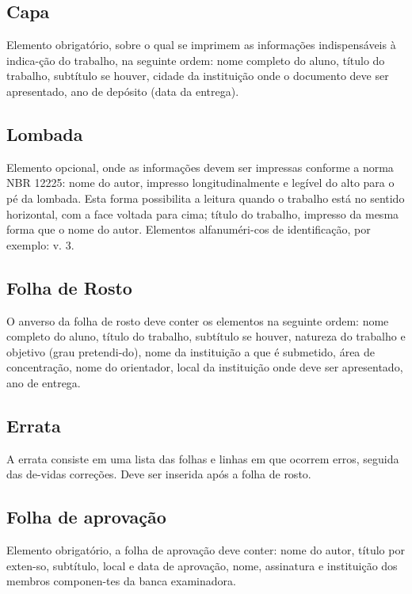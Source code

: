 \subsection{Capa}

Elemento obrigatório, sobre o qual se imprimem as informações
indispensáveis à indica-ção do trabalho, na seguinte ordem: nome completo do aluno, título do trabalho, subtítulo se houver, cidade da instituição onde o documento deve ser apresentado, ano de depósito (data da entrega).

\subsection{Lombada}

Elemento opcional, onde as informações devem ser impressas
conforme a norma NBR 12225: nome do autor, impresso longitudinalmente e legível do alto para o pé da lombada. Esta forma possibilita a leitura quando o trabalho está no sentido horizontal, com a face voltada para cima; título do trabalho, impresso da mesma forma que o nome do autor. Elementos alfanuméri-cos de identificação, por exemplo: v. 3.

\subsection{Folha de Rosto}

O anverso da folha de rosto deve conter os elementos na seguinte
ordem: nome completo do aluno, título do trabalho, subtítulo se houver, natureza do trabalho e objetivo (grau pretendi-do), nome da instituição a que é submetido, área de concentração, nome do orientador, local da instituição onde deve ser apresentado, ano de entrega.

\subsection{Errata}

A errata consiste em uma lista das folhas e linhas em que ocorrem
erros, seguida das de-vidas correções. Deve ser inserida após a folha de rosto.

\subsection{Folha de aprovação}

Elemento obrigatório, a folha de aprovação deve conter: nome do
autor, título por exten-so, subtítulo, local e data de aprovação, nome, assinatura e instituição dos membros componen-tes da banca examinadora.

